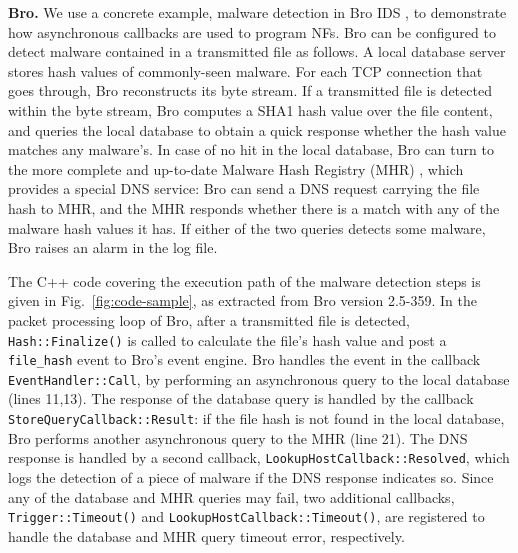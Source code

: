 \noindent\textbf{Bro.} We use a concrete example, malware detection in Bro IDS \cite{bro}, to demonstrate how asynchronous callbacks are used to program NFs. Bro can be configured to detect malware contained in a transmitted file as follows. %
 A local database server %
 stores hash values of commonly-seen malware. For each TCP connection that goes through, Bro reconstructs its byte stream. %
 If a transmitted file is detected within the byte stream, Bro computes a SHA1 hash value over the file content, and queries the local database to obtain a quick response whether the hash value matches any malware's. In case of no hit in the local database, Bro can turn to the more complete and up-to-date Malware Hash Registry (MHR) \cite{MHR}, which provides a special DNS service: Bro can send a DNS request carrying the file hash to MHR, and the MHR responds whether there is a match with any of the malware hash values it has. If either of the two queries detects some malware, Bro raises an alarm in the log file.

The C++ code covering the execution path of the malware detection steps is given in Fig.~\ref{fig:code-sample}, as extracted from Bro version 2.5-359. In the packet processing loop of Bro, after a transmitted file is detected, \lstinline[style=InlineStyle]{Hash::Finalize()} is called to calculate the file's hash value and post a \lstinline[style=InlineStyle]{file_hash} event to Bro's event engine. Bro handles the event in the callback \lstinline[style=InlineStyle]{EventHandler::Call}, by performing an asynchronous query to the local database (lines 11,13). The response of the database query is handled by the callback \lstinline[style=InlineStyle]{StoreQueryCallback::Result}: if the file hash is not found in the local database, Bro performs another asynchronous query to the MHR (line 21). The DNS response is handled by a second callback, \lstinline[style=InlineStyle]{LookupHostCallback::Resolved}, which logs the detection of a piece of malware if the DNS response indicates so. %
 Since any of the database and MHR queries may fail, two additional callbacks, \lstinline[style=InlineStyle]{Trigger::Timeout()} and \lstinline[style=InlineStyle]{LookupHostCallback::Timeout()}, are registered to handle the database and MHR query timeout error, respectively.

